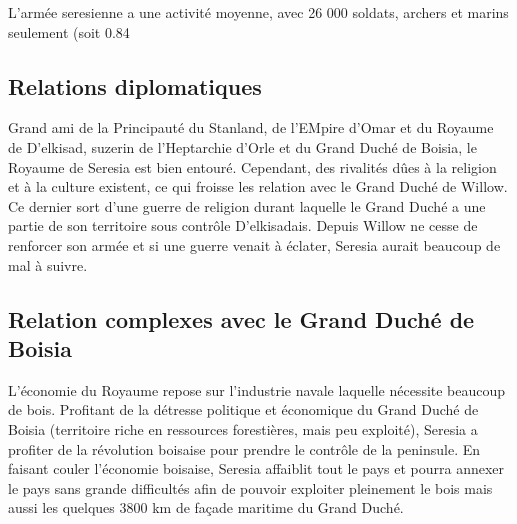 \documentclass[french, a4paper, 12pt]{article}
\begin{document}
L'armée seresienne a une activité moyenne, avec 26 000 soldats, archers et marins seulement (soit 0.84%

\subsection{Relations diplomatiques}

Grand ami de la Principauté du Stanland, de l'EMpire d'Omar et du Royaume de D'elkisad, suzerin de l'Heptarchie d'Orle et du Grand Duché de Boisia, le Royaume de Seresia est bien entouré. Cependant, des rivalités dûes à la religion et à la culture existent, ce qui froisse les relation avec le Grand Duché de Willow. Ce dernier sort d'une guerre de religion durant laquelle le Grand Duché a une partie de son territoire sous contrôle D'elkisadais. Depuis Willow ne cesse de renforcer son armée et si une guerre venait à éclater, Seresia aurait beaucoup de mal à suivre.

\subsection{Relation complexes avec le Grand Duché de Boisia}

L'économie du Royaume repose sur l'industrie navale laquelle nécessite beaucoup de bois. Profitant de la détresse politique et économique du Grand Duché de Boisia (territoire riche en ressources forestières, mais peu exploité), Seresia a profiter de la révolution boisaise pour prendre le contrôle de la peninsule. En faisant couler l'économie boisaise, Seresia affaiblit tout le pays et pourra annexer le pays sans grande difficultés afin de pouvoir exploiter pleinement le bois mais aussi les quelques 3800 km de façade maritime du Grand Duché.
\end{document}
